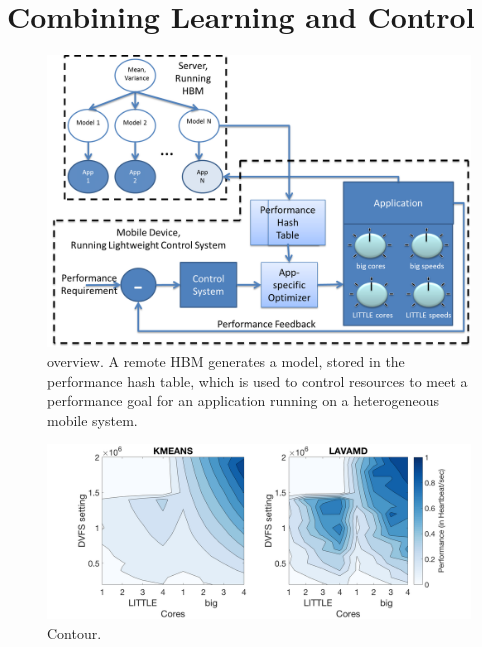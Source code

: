 \section{Combining Learning and Control}
\begin{figure}
\includegraphics[width=\columnwidth]{figures/ControlLearning.png}
\caption{\SYSTEM{} overview. A remote HBM generates a model, stored in
  the performance hash table, which is used to control resources to
  meet a performance goal for an application running on a
  heterogeneous mobile system.}
  \label{fig:overview}
\end{figure}
\begin{figure}
\centering
\includegraphics[width=\columnwidth]{figures/performance-contour2.png}
\caption{Contour.}
  \label{fig:contour}
\end{figure}

